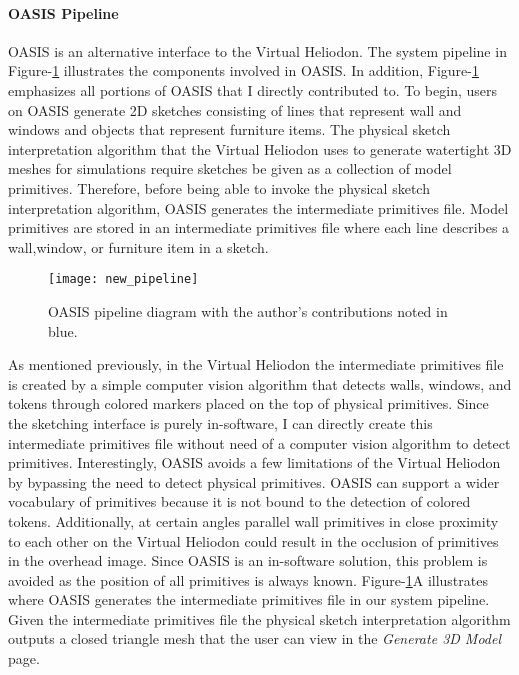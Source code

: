 \paragraph{OASIS Pipeline}
OASIS is an alternative interface to the Virtual Heliodon. 
The system pipeline in Figure-\ref{fig:new_pipeline} illustrates the components involved in OASIS.
In addition, Figure-\ref{fig:new_pipeline} emphasizes all portions of OASIS that I directly contributed to.
To begin, users on OASIS generate 2D sketches consisting of lines that represent wall and windows and objects that represent furniture items.
The physical sketch interpretation algorithm that the Virtual Heliodon uses to generate watertight 3D meshes for simulations require sketches be given as a collection of model primitives. 
Therefore, before being able to invoke the physical sketch interpretation algorithm, OASIS generates the intermediate primitives file.
Model primitives are stored in an intermediate primitives file where each line describes a wall,window, or furniture item in a sketch.
\begin{figure}[!ht]
\centering
\caption[Diagram of OASIS pipeline.]{OASIS pipeline diagram with the author's contributions noted in blue.}
\label{fig:new_pipeline}
\texttt{[image: new\_pipeline]}
\end{figure}
As mentioned previously, in the Virtual Heliodon the intermediate primitives file is created by a simple computer vision algorithm that detects walls, windows, and tokens through colored markers placed on the top of physical primitives.
Since the sketching interface is purely in-software, I can directly create this intermediate primitives file without need of a computer vision algorithm to detect primitives.
Interestingly, OASIS avoids a few limitations of the Virtual Heliodon by bypassing the need to detect physical primitives. 
OASIS can support a wider vocabulary of primitives because it is not bound to the detection of colored tokens.
Additionally, at certain angles parallel wall primitives in close proximity to each other on the Virtual Heliodon could result in the occlusion of primitives in the overhead image. 
Since OASIS is an in-software solution, this problem is avoided as the position of all primitives is always known.
Figure-\ref{fig:new_pipeline}A illustrates where OASIS generates the intermediate primitives file in our system pipeline.
Given the intermediate primitives file the physical sketch interpretation algorithm outputs a closed triangle mesh that the user can view in the \textit{Generate 3D Model} page.
